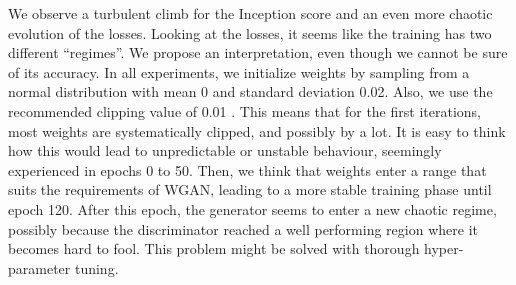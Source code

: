 We observe a turbulent climb for the Inception score and an even more chaotic evolution of the losses. Looking at the losses, it seems like the training has two different ``regimes''. We propose an interpretation, even though we cannot be sure of its accuracy. In all experiments, we initialize weights by sampling from a normal distribution with mean 0 and standard deviation 0.02. Also, we use the recommended clipping value of 0.01 \cite{arjovsky2017wasserstein}. This means that for the first iterations, most weights are systematically clipped, and possibly by a lot. It is easy to think how this would lead to unpredictable or unstable behaviour, seemingly experienced in epochs 0 to 50. Then, we think that weights enter a range that suits the requirements of WGAN, leading to a more stable training phase until epoch 120. After this epoch, the generator seems to enter a new chaotic regime, possibly because the discriminator reached a well performing region where it becomes hard to fool. This problem might be solved with thorough hyper-parameter tuning.